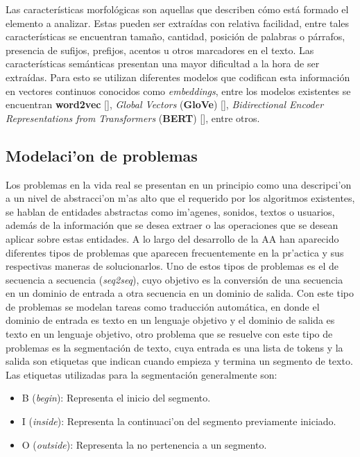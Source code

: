 Las características morfológicas son aquellas que describen cómo está formado el elemento a analizar.
Estas pueden ser extraídas con relativa facilidad, entre tales características se encuentran tamaño, 
cantidad, posición de palabras o párrafos, presencia de sufijos, prefijos, acentos u otros marcadores
en el texto. Las características semánticas presentan una mayor dificultad a la hora de ser extraídas.
Para esto se utilizan diferentes modelos que codifican esta información en vectores continuos conocidos como 
\emph{embeddings}, entre los modelos existentes se encuentran
\textbf{word2vec} [\cite{mikolov2013efficient}], 
\emph{Global Vectors} (\textbf{GloVe}) [\cite{pennington2014glove}], 
\emph{Bidirectional Encoder Representations from Transformers} (\textbf{BERT}) [\cite{devlin2018bert}],
entre otros.

\subsection{Modelaci'on de problemas}

Los problemas en la vida real se presentan en un principio como una descripci'on a un nivel de abstracci'on 
m'as alto que el requerido por los algoritmos existentes, se hablan de entidades abstractas como im'agenes,
sonidos, textos o usuarios, además de la información que se desea extraer o las operaciones que se
desean aplicar sobre estas entidades. A lo largo del desarrollo de la AA han aparecido diferentes tipos de problemas 
que aparecen frecuentemente en la pr'actica y sus respectivas maneras de solucionarlos. Uno de estos tipos de problemas
es el de secuencia a secuencia (\emph{seq2seq}), cuyo objetivo es la conversión de una secuencia en un dominio de entrada a otra 
secuencia en un dominio de salida. Con este tipo de problemas se modelan tareas como traducción automática, en 
donde el dominio de entrada es texto en un lenguaje objetivo y el dominio de salida es texto en un lenguaje objetivo,
otro problema que se resuelve con este tipo de problemas es la segmentación de texto, cuya entrada es una lista de tokens
y la salida son etiquetas que indican cuando empieza y termina un segmento de texto. Las etiquetas utilizadas para 
la segmentación generalmente son:

\begin{itemize}
	\item B (\emph{begin}): Representa el inicio del segmento.
	\item I (\emph{inside}): Representa la continuaci'on del segmento previamente iniciado.
	\item O (\emph{outside}): Representa la no pertenencia a un segmento.
\end{itemize}


